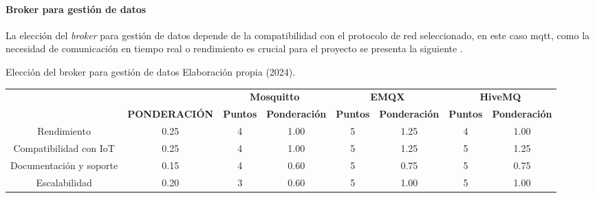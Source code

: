 \paragraph{Broker para gestión de datos}
La elección del \textit{broker} para gestión de datos depende de la compatibilidad con el protocolo de red seleccionado, en este caso \acrshort{mqtt}, como la necesidad de comunicación en tiempo real o rendimiento es crucial para el proyecto se presenta la siguiente .
\begin{tabla}[brk] 
{Elección del broker para gestión de datos}
{Elaboración propia (2024).}
\centering
\resizebox{15cm}{!}
{
\begin{tabular}{|c|c|c|c|c|c|c|c|} 
\hline
\rowcolor[rgb]{0.678,0.702,0.698} {\cellcolor[rgb]{0.678,0.702,0.698}}                                    & {\cellcolor[rgb]{0.678,0.702,0.698}}                                       & \multicolumn{2}{c|}{\textbf{Mosquitto}} & \multicolumn{2}{c|}{\textbf{EMQX}}     & \multicolumn{2}{c|}{\textbf{HiveMQ}}    \\
\rowcolor[rgb]{0.678,0.702,0.698} \multirow{-2}{*}{{\cellcolor[rgb]{0.678,0.702,0.698}}\textbf{CRITERIO}} & \multirow{-2}{*}{{\cellcolor[rgb]{0.678,0.702,0.698}}\textbf{PONDERACIÓN}} & \textbf{Puntos} & \textbf{Ponderación}  & \textbf{Puntos} & \textbf{Ponderación} & \textbf{Puntos} & \textbf{Ponderación}  \\ 
\hline
\rowcolor[rgb]{0.027,0.894,0.698} Rendimiento                                                             & 0.25                                                                       & 4               & 1.00                  & 5               & 1.25                 & 4               & 1.00                  \\ 
\hline
\rowcolor[rgb]{0.027,0.894,0.675} Compatibilidad con IoT                                                  & 0.25                                                                       & 4               & 1.00                  & 5               & 1.25                 & 5               & 1.25                  \\ 
\hline
Documentación y soporte                                                                                   & 0.15                                                                       & 4               & 0.60                  & 5               & 0.75                 & 5               & 0.75                  \\ 
\hline
\rowcolor[rgb]{0.027,0.894,0.675} Escalabilidad                                                           & 0.20                                                                       & 3               & 0.60                  & 5               & 1.00                 & 5               & 1.00                  \\ 

\end{tabular}}
\end{tabla}
